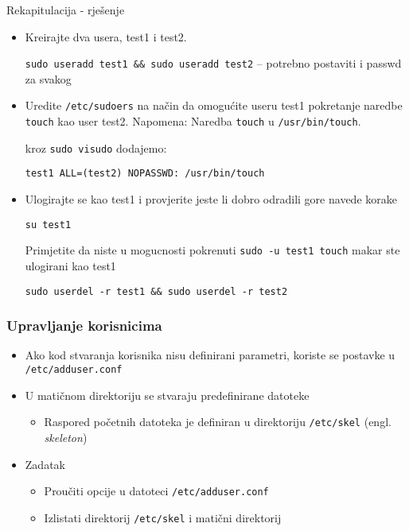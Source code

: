 \documentclass[table,usenames,dvipsnames] {beamer}
\newcommand{\shell}[1]{\texttt{#1}}
\begin{document}
\begin{frame}{Rekapitulacija - rješenje}
\begin{itemize}
\item Kreirajte dva usera, test1 i test2.

\shell{sudo useradd test1 \&\& sudo useradd test2} -- potrebno postaviti i passwd za svakog

\item Uredite \shell{/etc/sudoers} na način da omogućite useru test1 pokretanje naredbe \shell{touch} kao user test2. Napomena: Naredba \shell{touch} u \shell{/usr/bin/touch}.

kroz \shell{sudo visudo} dodajemo:

\shell{test1 ALL=(test2) NOPASSWD: /usr/bin/touch}

\item Ulogirajte se kao test1 i provjerite jeste li dobro odradili gore navede korake

\shell{su test1}

Primjetite da niste u mogucnosti pokrenuti \shell{sudo -u test1 touch} makar ste ulogirani kao test1

\shell{sudo userdel -r test1 \&\& sudo userdel -r test2}
\end{itemize}
\end{frame}



\begin{frame}[t]
\frametitle{Upravljanje korisnicima}
\begin{itemize}
  \item Ako kod stvaranja korisnika nisu definirani parametri, koriste se 
        postavke u \shell{/etc/adduser.conf}
  \item U matičnom direktoriju se stvaraju predefinirane datoteke
  \begin{itemize}
     \item Raspored početnih datoteka je definiran u direktoriju \shell{/etc/skel} (engl. \emph{skeleton})
  \end{itemize}
\end{itemize}
\begin{itemize}
  \item Zadatak
  \begin{itemize}
    \item Proučiti opcije u datoteci \shell{/etc/adduser.conf}
    \item Izlistati direktorij \shell{/etc/skel} i matični direktorij
  \end{itemize}
\end{itemize}
\end{frame}
\end{document}
